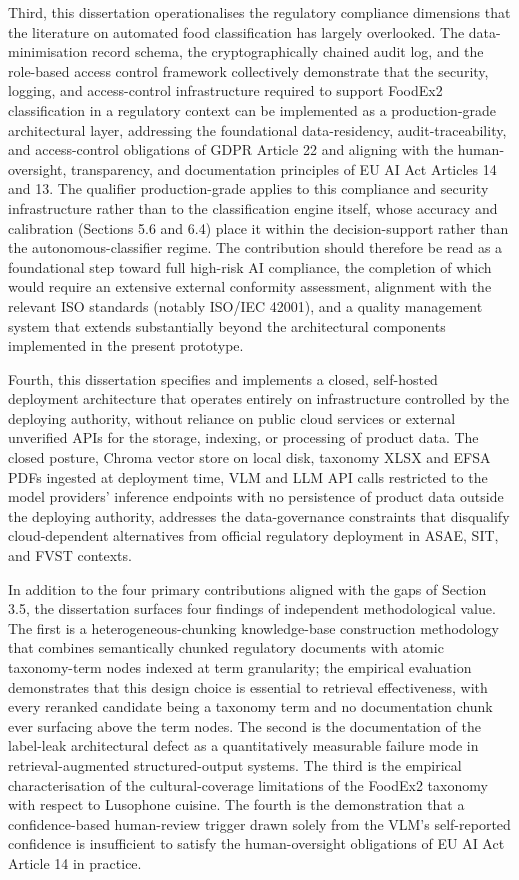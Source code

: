 Third, this dissertation operationalises the regulatory compliance dimensions that the literature on automated food classification has largely overlooked. The data-minimisation record schema, the cryptographically chained audit log, and the role-based access control framework collectively demonstrate that the security, logging, and access-control infrastructure required to support FoodEx2 classification in a regulatory context can be implemented as a production-grade architectural layer, addressing the foundational data-residency, audit-traceability, and access-control obligations of GDPR Article 22 and aligning with the human-oversight, transparency, and documentation principles of EU AI Act Articles 14 and 13. The qualifier production-grade applies to this compliance and security infrastructure rather than to the classification engine itself, whose accuracy and calibration (Sections 5.6 and 6.4) place it within the decision-support rather than the autonomous-classifier regime. The contribution should therefore be read as a foundational step toward full high-risk AI compliance, the completion of which would require an extensive external conformity assessment, alignment with the relevant ISO standards (notably ISO/IEC 42001), and a quality management system that extends substantially beyond the architectural components implemented in the present prototype.

Fourth, this dissertation specifies and implements a closed, self-hosted deployment architecture that operates entirely on infrastructure controlled by the deploying authority, without reliance on public cloud services or external unverified APIs for the storage, indexing, or processing of product data. The closed posture, Chroma vector store on local disk, taxonomy XLSX and EFSA PDFs ingested at deployment time, VLM and LLM API calls restricted to the model providers' inference endpoints with no persistence of product data outside the deploying authority, addresses the data-governance constraints that disqualify cloud-dependent alternatives from official regulatory deployment in ASAE, SIT, and FVST contexts.

In addition to the four primary contributions aligned with the gaps of Section 3.5, the dissertation surfaces four findings of independent methodological value. The first is a heterogeneous-chunking knowledge-base construction methodology that combines semantically chunked regulatory documents with atomic taxonomy-term nodes indexed at term granularity; the empirical evaluation demonstrates that this design choice is essential to retrieval effectiveness, with every reranked candidate being a taxonomy term and no documentation chunk ever surfacing above the term nodes. The second is the documentation of the label-leak architectural defect as a quantitatively measurable failure mode in retrieval-augmented structured-output systems. The third is the empirical characterisation of the cultural-coverage limitations of the FoodEx2 taxonomy with respect to Lusophone cuisine. The fourth is the demonstration that a confidence-based human-review trigger drawn solely from the VLM's self-reported confidence is insufficient to satisfy the human-oversight obligations of EU AI Act Article 14 in practice.

